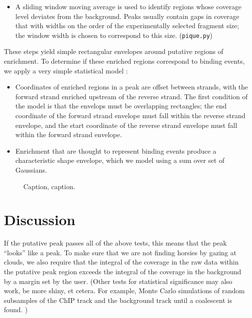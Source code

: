 \documentclass{bioinfo}
\begin{document}
\begin{methods}
\begin{itemize}
\item A sliding window moving average is used to identify regions
  whose coverage level deviates from the background. Peaks usually
  contain gaps in coverage that with widths on the order of the
  experimentally selected fragment size; the window width is chosen to
  correspond to this size. (\texttt{pique.py})



\end{itemize}

These steps yield simple rectangular envelopes around putative regions
of enrichment. To determine if these enriched regions correspond to
binding events, we apply a very simple statistical model :

\begin{itemize}

\item Coordinates of enriched regions in a peak are offset between
  strands, with the forward strand enriched upstream of the reverse
  strand. The first condition of the model is that the envelops must
  be overlapping rectangles; the end coordinate of the forward strand
  envelope must fall within the reverse strand envelope, and the
  start coordinate of the reverse strand envelope must fall within the
  forward strand envelope. 

\item Enrichment that are thought to represent binding events produce
  a characteristic shape envelope, which we model using a sum over set
  of Gaussians.

\end{itemize}

\end{methods}

\begin{figure}[!tpb]%
\caption{Caption, caption.}\label{fig:01}
\end{figure}

\section{Discussion}

If the putative peak passes all of the above tests, this means that
the peak ``looks'' like a peak. To make sure that we are not finding
horsies by gazing at clouds, we also require that the integral of the
coverage in the raw data within the putative peak region exceeds the
integral of the coverage in the background by a margin set by the
user. (Other tests for statistical significance may also work, be more
shiny, et cetera. For example, Monte Carlo simulations of random
subsamples of the ChIP track and the background track until a
coalescent is found. )
\end{document}
